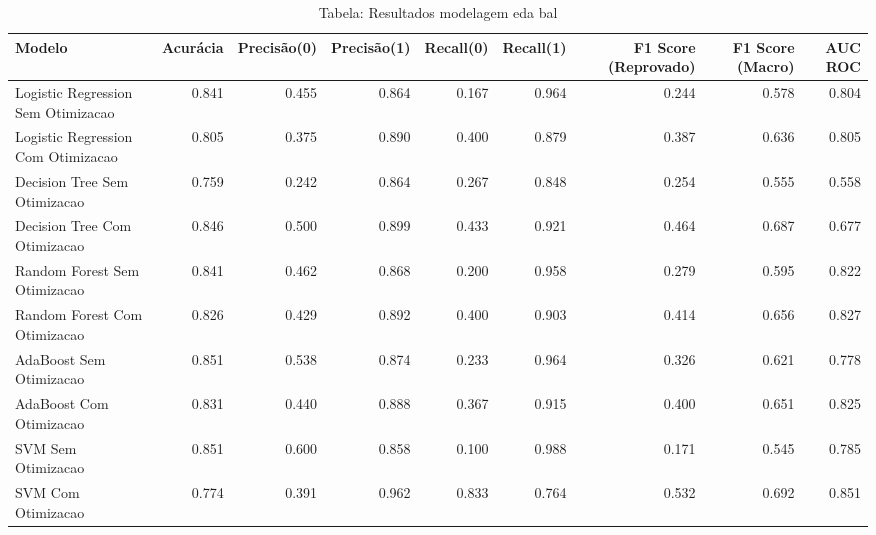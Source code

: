 \begin{table}[H] %
    \centering
    \caption{Tabela: Resultados modelagem eda bal}
    \label{tab:resultados_modelagem_eda_bal}
    \renewcommand{\arraystretch}{1.25} %
    \begin{adjustwidth}{ -1in }{ -1in } %
    \centering %
    \small %
    \begin{tabular}{lrrrrrrrr}
\toprule
                            Modelo &  Acurácia &  Precisão(0) &  Precisão(1) &  Recall(0) &  Recall(1) &  F1 Score (Reprovado) &  F1 Score (Macro) &  AUC ROC \\
\midrule
Logistic Regression Sem Otimizacao &     0.841 &        0.455 &        0.864 &      0.167 &      0.964 &                 0.244 &             0.578 &    0.804 \\
Logistic Regression Com Otimizacao &     0.805 &        0.375 &        0.890 &      0.400 &      0.879 &                 0.387 &             0.636 &    0.805 \\
      Decision Tree Sem Otimizacao &     0.759 &        0.242 &        0.864 &      0.267 &      0.848 &                 0.254 &             0.555 &    0.558 \\
      Decision Tree Com Otimizacao &     0.846 &        0.500 &        0.899 &      0.433 &      0.921 &                 0.464 &             0.687 &    0.677 \\
      Random Forest Sem Otimizacao &     0.841 &        0.462 &        0.868 &      0.200 &      0.958 &                 0.279 &             0.595 &    0.822 \\
      Random Forest Com Otimizacao &     0.826 &        0.429 &        0.892 &      0.400 &      0.903 &                 0.414 &             0.656 &    0.827 \\
           AdaBoost Sem Otimizacao &     0.851 &        0.538 &        0.874 &      0.233 &      0.964 &                 0.326 &             0.621 &    0.778 \\
           AdaBoost Com Otimizacao &     0.831 &        0.440 &        0.888 &      0.367 &      0.915 &                 0.400 &             0.651 &    0.825 \\
                SVM Sem Otimizacao &     0.851 &        0.600 &        0.858 &      0.100 &      0.988 &                 0.171 &             0.545 &    0.785 \\
                SVM Com Otimizacao &     0.774 &        0.391 &        0.962 &      0.833 &      0.764 &                 0.532 &             0.692 &    0.851 \\
\bottomrule
\end{tabular}
    \end{adjustwidth}
    \renewcommand{\arraystretch}{1.0} %
\end{table}
